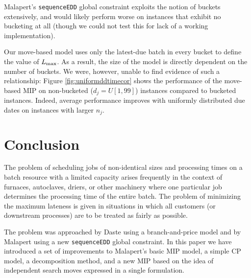 \documentclass[13pt, letterpaper, oneside]{book}
\begin{document}
Malapert's \texttt{sequenceEDD} global constraint exploits the notion of buckets
extensively, and would likely perform worse on instances that exhibit no
bucketing at all (though we could not test this for lack of a working
implementation).

Our move-based model uses only the latest-due batch in every bucket to define
the value of $L_{\text{max}}$. As a result, the size of the model is directly dependent
on the number of buckets. We were, however, unable to find evidence of such a
relationship: Figure \ref{fig:uniformddtimecor} shows the performance of the
move-based MIP on non-bucketed ($d_j = U[1, 99]$) instances compared to bucketed
instances.  Indeed, average performance improves with uniformly distributed due dates on
instances with larger $n_j$.



\chapter{Conclusion}\label{sec:futurework}
The problem of scheduling jobs of non-identical sizes and processing times on a
batch resource with a limited capacity arises frequently in the context of
furnaces, autoclaves, driers, or other machinery where one particular job
determines the processing time of the entire batch. The problem of minimizing
the maximum lateness is given in situations in which all customers (or
downstream processes) are to be treated as fairly as possible.

The problem was approached by Daste \citet{Daste1} using a branch-and-price
model and by Malapert \citet{Malapert} using a new \texttt{sequenceEDD} global
constraint. In this paper we have introduced a set of improvements to Malapert's
basic MIP model, a simple CP model, a decomposition method, and a new MIP based
on the idea of independent search moves expressed in a single formulation.
\end{document}
